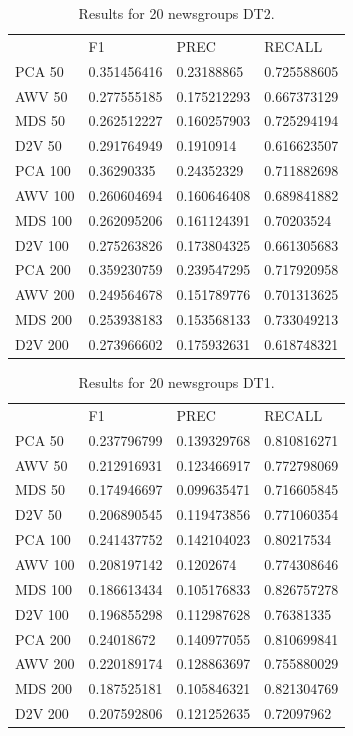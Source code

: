 \begin{table}[]
	\begin{tabular}{llll}
		& F1          & PREC        & RECALL      \\
		PCA 50  & 0.351456416 & 0.23188865  & 0.725588605 \\
		AWV 50  & 0.277555185 & 0.175212293 & 0.667373129 \\
		MDS 50  & 0.262512227 & 0.160257903 & 0.725294194 \\
		D2V 50  & 0.291764949 & 0.1910914   & 0.616623507 \\
		PCA 100 & 0.36290335  & 0.24352329  & 0.711882698 \\
		AWV 100 & 0.260604694 & 0.160646408 & 0.689841882 \\
		MDS 100 & 0.262095206 & 0.161124391 & 0.70203524  \\
		D2V 100 & 0.275263826 & 0.173804325 & 0.661305683 \\
		PCA 200 & 0.359230759 & 0.239547295 & 0.717920958 \\
		AWV 200 & 0.249564678 & 0.151789776 & 0.701313625 \\
		MDS 200 & 0.253938183 & 0.153568133 & 0.733049213 \\
		D2V 200 & 0.273966602 & 0.175932631 & 0.618748321
	\end{tabular}
	\caption{Results for 20 newsgroups DT2.}
	\label{table:Newsgroups}
\end{table}

\begin{table}[]
	\begin{tabular}{llll}
		& F1          & PREC        & RECALL      \\
		PCA 50  & 0.237796799 & 0.139329768 & 0.810816271 \\
		AWV 50  & 0.212916931 & 0.123466917 & 0.772798069 \\
		MDS 50  & 0.174946697 & 0.099635471 & 0.716605845 \\
		D2V 50  & 0.206890545 & 0.119473856 & 0.771060354 \\
		PCA 100 & 0.241437752 & 0.142104023 & 0.80217534  \\
		AWV 100 & 0.208197142 & 0.1202674   & 0.774308646 \\
		MDS 100 & 0.186613434 & 0.105176833 & 0.826757278 \\
		D2V 100 & 0.196855298 & 0.112987628 & 0.76381335  \\
		PCA 200 & 0.24018672  & 0.140977055 & 0.810699841 \\
		AWV 200 & 0.220189174 & 0.128863697 & 0.755880029 \\
		MDS 200 & 0.187525181 & 0.105846321 & 0.821304769 \\
		D2V 200 & 0.207592806 & 0.121252635 & 0.72097962 
	\end{tabular}
	\caption{Results for 20 newsgroups DT1.}
	\label{table:Newsgroups}
\end{table}


